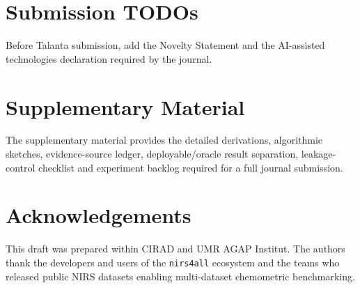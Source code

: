 \documentclass[11pt,a4paper]{article}
\begin{document}
\section*{Submission TODOs}

Before Talanta submission, add the Novelty Statement and the AI-assisted
technologies declaration required by the journal.

\section*{Supplementary Material}

The supplementary material provides the detailed derivations, algorithmic
sketches, evidence-source ledger, deployable/oracle result separation,
leakage-control checklist and experiment backlog required for a full journal
submission.

\section*{Acknowledgements}

This draft was prepared within CIRAD and UMR AGAP Institut.  The authors thank
the developers and users of the \texttt{nirs4all} ecosystem and the teams who
released public NIRS datasets enabling multi-dataset chemometric benchmarking.



\end{document}
